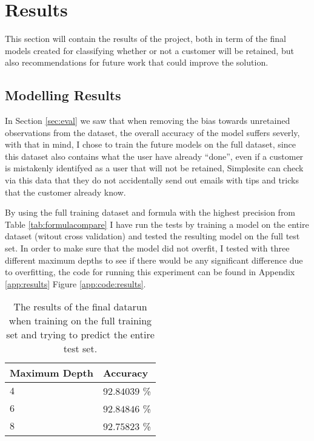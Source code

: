 \section{Results}
\label{sec:results}

This section will contain the results of the project, both in term of the final
models created for classifying whether or not a customer will be retained, but
also recommendations for future work that could improve the solution.


\subsection{Modelling Results}

In Section \ref{sec:eval} we saw that when removing the bias towards unretained
observations from the dataset, the overall accuracy of the model suffers
severly, with that  in mind, I chose to train the future models on the full
dataset, since this dataset also contains what the user have already ``done'',
even if a customer is mistakenly identifyed as a user that will not be retained,
Simplesite can check via this data that they do not accidentally send out emails
with tips and tricks that the customer already know.

By using the full training dataset and formula with the highest precision from
Table \ref{tab:formulacompare} I have run the tests by training a model on the
entire dataset (witout cross validation) and tested the resulting model on the
full test set. In order to make sure that the model did not overfit, I tested
with three different maximum depths to see if there would be any significant
difference due to overfitting, the code for running this experiment can be found
in Appendix \ref{app:results} Figure \ref{app:code:results}.

\begin{table}[H]
  \centering
  \begin{tabular}{l|l}
    \textbf{Maximum Depth} & \textbf{Accuracy} \\ \hline
    $4$                    & $92.84039$ \%     \\
    $6$                    & $92.84846$ \%     \\
    $8$                    & $92.75823$ \%
  \end{tabular}
  \caption{The results of the final datarun when training on the full training
    set and trying to predict the entire test set.}
  \label{tab:results00}
\end{table}

